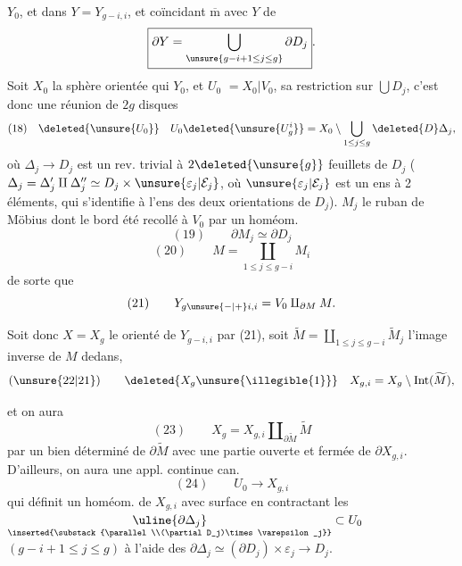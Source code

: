 $Y_0$, et dans $Y=Y_{g-i,i}$, et coïncidant
$\overline{\mathrm m}$ avec $Y$  de
\[
\boxed{\partial Y=\bigcup_{\unsure{g-i+1\le j\le g}}\partial D_j}.
\]
 Soit $X_0$ la sphère orientée qui  $Y_0$,
et $U_0$  $=X_0\vert V_0$, sa restriction sur $\bigcup D_j$,
c'est donc  une réunion de $2g$ disques
\[
(18)\quad \deleted{\unsure{U_0}}\quad U_0\deleted{\unsure{U_g^i}}=X_0\setminus\bigcup_{1\le j\le g}\deleted{D}\Delta_j,
\]
où $\Delta_j\longrightarrow D_j$ est un rev. trivial à $2\deleted{\unsure{g}}$
feuillets de $D_j$ ($\Delta_j=\Delta'_j\amalg\Delta''_j\simeq D_j\times\unsure{\varepsilon_j|\mathcal{E}_j}$,
où $\unsure{\varepsilon_j|\mathcal{E}_j}$ est un ens à 2 éléments, qui s'identifie
à l'ens des deux orientations de
$D_j$). 
 $M_j$  le ruban de Möbius dont le bord 
été recollé à $V_0$ par un homéom.
\[
(19)\qquad \partial M_j\simeq\partial D_j
\]
\[
(20)\qquad M=\coprod_{1\le j\le g-i} M_i
\]
de sorte que
\[
(21)\qquad Y_{g\unsure{-|+}i,i}=V_0\amalg_{\partial M}M.
\]


Soit donc $X=X_g$ le  orienté
de $Y_{g-i,i}$  par (21), soit $\widetilde M=\coprod_{1\le j\le g-i}\widetilde M_j$
l'image inverse de $M$ dedans, 
 
\[
(\unsure{22|21})\qquad \deleted{X_g\unsure{\illegible{1}}}\quad X_{g,i}=X_g\setminus\operatorname{Int}(\widetilde M),
\]

et on aura
\[
(23)\qquad X_g=X_{g,i}\amalg_{\partial\widetilde M}\widetilde M
\]
par un  bien déterminé de $\partial\widetilde M$ avec une partie ouverte et fermée de $\partial X_{g,i}$. D'ailleurs, on aura une appl. continue can.
\[
(24)\qquad U_0\longrightarrow X_{g,i}
\]
qui définit un homéom. de $X_{g,i}$ avec   surface  en contractant les $\underset{\inserted{\substack{\parallel\\(\partial D_j)\times\varepsilon_j}}}{\uline{\partial\Delta_j}}\subset U_0$ $(g-i+1\leq j\leq g)$ à l'aide des  $\partial\Delta_j\simeq(\partial D_j)\times\varepsilon_j\longrightarrow D_j$.

